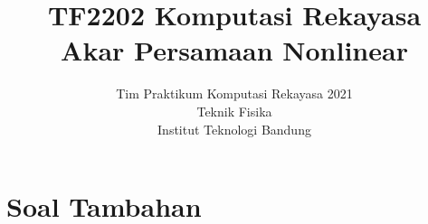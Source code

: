 \documentclass[a4paper,11pt,bahasa]{article} %
\begin{document}
\title{%
{\small TF2202 Komputasi Rekayasa}\\
Akar Persamaan Nonlinear
}
\author{Tim Praktikum Komputasi Rekayasa 2021\\
Teknik Fisika\\
Institut Teknologi Bandung}
\date{}
\maketitle













\section{Soal Tambahan}











\end{document}
